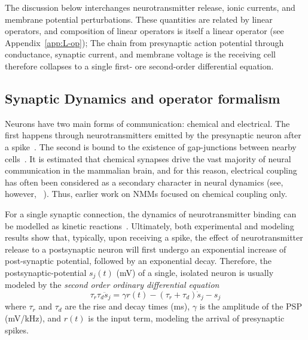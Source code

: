 \documentclass[11pt]{article}
\numberwithin{equation}{section}
\begin{document}
\begin{tcolorbox}[colback=gray!6,colframe=gray!6,enlarge left by=0mm,
  boxrule=0pt, enhanced, sharp corners]
The discussion below interchanges neurotransmitter release, ionic currents, and membrane potential perturbations. These quantities are related by linear operators, and composition of linear operators is itself a linear operator  (see Appendix~\ref{app:L-op}); 
The chain from presynaptic action potential through conductance, synaptic current, and membrane voltage is the receiving cell therefore collapses to a single first- ore second-order differential equation.
\end{tcolorbox}

\subsection{Synaptic Dynamics and operator formalism}\label{sec:synaptic-dynamics}
Neurons have two main forms of communication: chemical and electrical.
The first happens through neurotransmitters emitted by the presynaptic
neuron after a spike~\cite{hillis2020}.
The second is bound to the existence of gap-junctions between nearby cells~\cite{goodenough2009}.
It is estimated that chemical synapses drive the vast majority of
neural communication in the mammalian brain, and for this reason, electrical
coupling has often been considered as a secondary character in neural dynamics (see, however, ~\cite{pereda2014,alcami2019,vaughn2022}).
Thus, earlier work on NMMs focused on chemical coupling only. %

For a single synaptic connection, the dynamics of neurotransmitter binding
can be modelled as kinetic reactions~\cite{destexhe1994,Destexhe1998,dayan2001}.
Ultimately, both experimental and modeling results show that, typically, upon receiving a spike, the effect of neurotransmitter release to a postsynaptic neuron will first undergo an exponential increase of post-synaptic potential, followed by an exponential decay. 
Therefore, the postsynaptic-potential $s_j(t)$ (mV) of a single, isolated neuron
is usually modeled by the \textit{second order ordinary differential equation}~\cite{dayan2001,gerstner2014}
\begin{equation}\label{eq:synapses_single}
    \tau_r\tau_d\ddot s_j = \gamma r(t) - (\tau_r+\tau_d) \dot s_j -s_j
\end{equation}
where $\tau_r$ and $\tau_d$ are the rise and decay times (ms), $\gamma$ is the amplitude of the PSP (mV/kHz), and $r(t)$ is the input term, modeling the arrival of presynaptic spikes.
 
\end{document}
